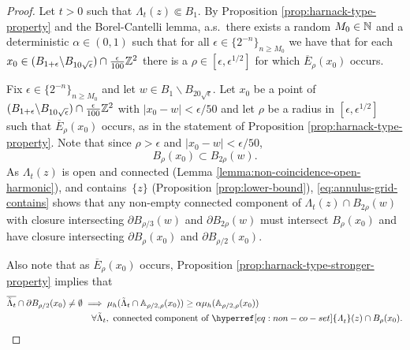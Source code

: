 \documentclass[12pt]{amsart}
\numberwithin{equation}{section}
\newcommand{\cluster}[2]{\hyperref[eq:non-co-set]{\mathit{\Lambda}^{#1}_{#2}}}
\begin{document}
	\begin{proof}
		Let $t>0$ such that ${\cluster{}{t}(z)} \Subset B_1$. By Proposition \ref{prop:harnack-type-property} and the Borel-Cantelli lemma, a.s.\ there exists a random $M_0 \in \mathbb{N}$ and a deterministic $\alpha \in (0,1)$ such that for all $\epsilon \in \{2^{-n}\}_{n \geq M_0}$ we have that for each $x_0 \in (B_{1 +\epsilon} \backslash B_{10 \sqrt{\epsilon}}) \cap \frac{\epsilon}{100} \mathbb{Z}^2$
		there is a $\rho \in [\epsilon, \epsilon^{1/2}]$ for which $\overline E_\rho(x_0)$ occurs. 
		
		
		Fix $\epsilon \in \{2^{-n}\}_{n \geq M_0}$ and let $w \in B_1 \backslash B_{20 \sqrt{\epsilon}}$. Let $x_0$ be a point of $(B_{1 + \epsilon} \backslash B_{10 \sqrt{\epsilon}}) \cap \frac{\epsilon}{100} \mathbb{Z}^2$
		with $|x_0 - w| < \epsilon/50$ and let $\rho$ be a radius in $[\epsilon, \epsilon^{1/2}]$ such that $\overline E_\rho(x_0)$ occurs, as in the statement of Proposition \ref{prop:harnack-type-property}. 
		Note that since $\rho > \epsilon$ and $|x_0-w| < \epsilon/50$, 
		\begin{equation} \label{eq:annulus-grid-contains}
		B_{\rho}(x_0) \subset B_{2 \rho}(w).
		\end{equation}
		As ${\cluster{}{t}(z)}$ is open and connected (Lemma \ref{lemma:non-coincidence-open-harmonic}), and contains~$\{z\}$ (Proposition \ref{prop:lower-bound}), \eqref{eq:annulus-grid-contains} shows that any non-empty connected component of ${\cluster{}{t}(z)} \cap B_{2 \rho}(w)$
		with closure intersecting $\partial B_{\rho/3}(w)$ and $\partial B_{2 \rho}(w)$
		must intersect $B_{\rho}(x_0)$ and have closure intersecting $\partial B_{\rho}(x_0)$ and $\partial B_{\rho/2}(x_0)$. 
		
		Also note that as $\overline E_\rho(x_0)$ occurs, Proposition \ref{prop:harnack-type-stronger-property} implies that
		\begin{equation} \label{eq:harnack-contrapositive}
		\begin{aligned}
		\overline{\tilde \Lambda_t} \cap \partial B_{\rho/2}(x_0) \neq \emptyset  &\implies \mu_h(\tilde \Lambda_t \cap \A_{\rho/2, \rho}(x_0)) \geq \alpha \mu_h(\A_{\rho/2, \rho}(x_0)) \\
		&\quad \forall  \tilde \Lambda_t, \mbox{ connected component of ${\cluster{}{t}(z)} \cap B_{\rho}(x_0)$}.
		\end{aligned}
		\end{equation}		
		

\end{proof}
\end{document}
